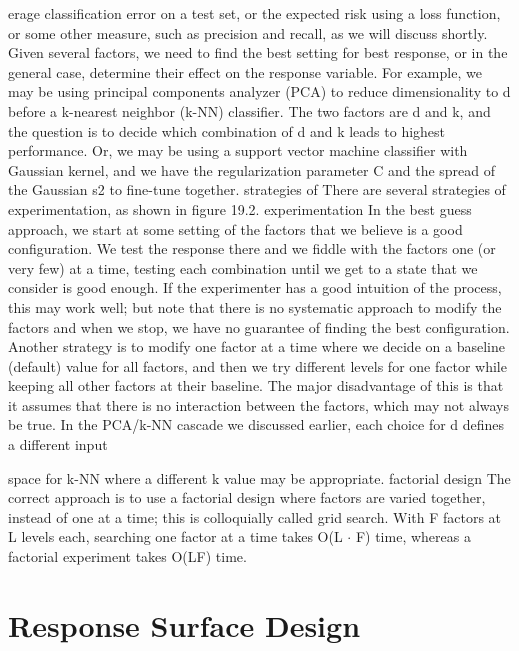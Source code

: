 erage classification error on a test set, or the expected risk using a loss function, or some other measure, such as precision and recall, as we will discuss shortly. Given several factors, we need to find the best setting for best response, or in the general case, determine their effect on the response variable. For example, we may be using principal components analyzer (PCA) to reduce dimensionality to d before a k-nearest neighbor (k-NN) classifier. The two factors are d and k, and the question is to decide which combination of d and k leads to highest performance. Or, we may be using a support vector machine classifier with Gaussian kernel, and we have the regularization parameter C and the spread of the Gaussian s2 to fine-tune together. strategies of There are several strategies of experimentation, as shown in figure 19.2. experimentation In the best guess approach, we start at some setting of the factors that we believe is a good configuration. We test the response there and we fiddle with the factors one (or very few) at a time, testing each combination until we get to a state that we consider is good enough. If the experimenter has a good intuition of the process, this may work well; but note that there is no systematic approach to modify the factors and when we stop, we have no guarantee of finding the best configuration. Another strategy is to modify one factor at a time where we decide on a baseline (default) value for all factors, and then we try different levels for one factor while keeping all other factors at their baseline. The major disadvantage of this is that it assumes that there is no interaction between the factors, which may not always be true. In the PCA/k-NN cascade we discussed earlier, each choice for d defines a different input

space for k-NN where a different k value may be appropriate. factorial design The correct approach is to use a factorial design where factors are varied together, instead of one at a time; this is colloquially called grid search. With F factors at L levels each, searching one factor at a time takes O(L $\cdot$ F) time, whereas a factorial experiment takes O(LF) time.

\section{Response Surface Design}

